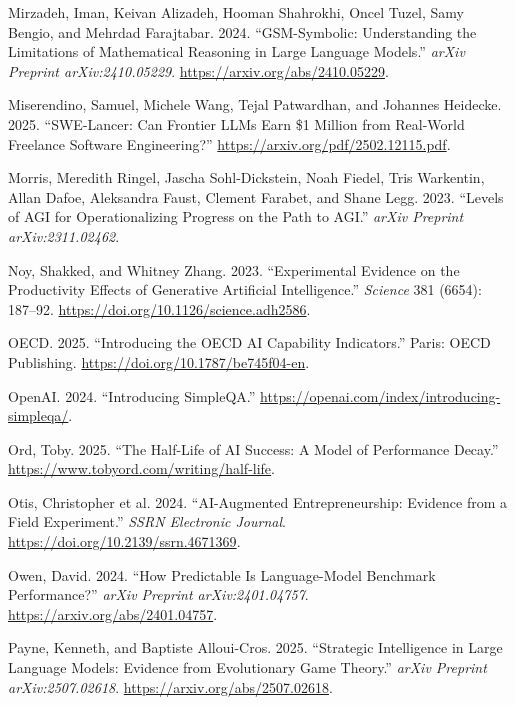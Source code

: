 \documentclass[
  letterpaper,
  DIV=11,
  numbers=noendperiod,
  oneside]{scrartcl}
\newlength{\cslhangindent}
\newenvironment{CSLReferences}[2] %
 {\begin{list}{}{%
  \setlength{\itemindent}{0pt}
  \setlength{\leftmargin}{0pt}
  \setlength{\parsep}{0pt}
  \ifodd #1
   \setlength{\leftmargin}{\cslhangindent}
   \setlength{\itemindent}{-1\cslhangindent}
  \fi
  \setlength{\itemsep}{#2\baselineskip}}}
 {\end{list}}
\begin{document}
\begin{CSLReferences}{1}{0}
Mirzadeh, Iman, Keivan Alizadeh, Hooman Shahrokhi, Oncel Tuzel, Samy
Bengio, and Mehrdad Farajtabar. 2024. {``GSM-Symbolic: Understanding the
Limitations of Mathematical Reasoning in Large Language Models.''}
\emph{arXiv Preprint arXiv:2410.05229}.
\url{https://arxiv.org/abs/2410.05229}.

Miserendino, Samuel, Michele Wang, Tejal Patwardhan, and Johannes
Heidecke. 2025. {``SWE-Lancer: Can Frontier LLMs Earn \$1 Million from
Real-World Freelance Software Engineering?''}
\url{https://arxiv.org/pdf/2502.12115.pdf}.

Morris, Meredith Ringel, Jascha Sohl-Dickstein, Noah Fiedel, Tris
Warkentin, Allan Dafoe, Aleksandra Faust, Clement Farabet, and Shane
Legg. 2023. {``Levels of AGI for Operationalizing Progress on the Path
to AGI.''} \emph{arXiv Preprint arXiv:2311.02462}.

Noy, Shakked, and Whitney Zhang. 2023. {``Experimental Evidence on the
Productivity Effects of Generative Artificial Intelligence.''}
\emph{Science} 381 (6654): 187--92.
\url{https://doi.org/10.1126/science.adh2586}.

OECD. 2025. {``Introducing the OECD AI Capability Indicators.''} Paris:
OECD Publishing. \url{https://doi.org/10.1787/be745f04-en}.

OpenAI. 2024. {``Introducing SimpleQA.''}
\url{https://openai.com/index/introducing-simpleqa/}.

Ord, Toby. 2025. {``The Half-Life of AI Success: A Model of Performance
Decay.''} \url{https://www.tobyord.com/writing/half-life}.

Otis, Christopher et al. 2024. {``AI-Augmented Entrepreneurship:
Evidence from a Field Experiment.''} \emph{SSRN Electronic Journal}.
\url{https://doi.org/10.2139/ssrn.4671369}.

Owen, David. 2024. {``How Predictable Is Language-Model Benchmark
Performance?''} \emph{arXiv Preprint arXiv:2401.04757}.
\url{https://arxiv.org/abs/2401.04757}.

Payne, Kenneth, and Baptiste Alloui-Cros. 2025. {``Strategic
Intelligence in Large Language Models: Evidence from Evolutionary Game
Theory.''} \emph{arXiv Preprint arXiv:2507.02618}.
\url{https://arxiv.org/abs/2507.02618}.


\end{CSLReferences}
\end{document}
